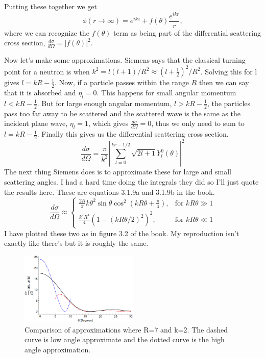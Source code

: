 \documentclass[12pt]{extarticle}
\begin{document}
Putting these together we get
\begin{equation}
   \phi(r\rightarrow\infty) = e^{ikz} + f(\theta)\frac{e^{ikr}}{r},
\end{equation}
where we can recognize the $f(\theta)$ term as being part of the differential scattering cross section, $\frac{d\sigma}{d\Omega} = \left|f(\theta)\right|^2$.

Now let's make some approximations. Siemens says that the classical turning point for a neutron is when $k^2 = l(l+1)/R^2 \approx (l+\frac{1}{2})^2/R^2$. Solving this for l gives $l=kR-\frac{1}{2}$. Now, if a particle passes within the range $R$ then we can say that it is absorbed and $\eta_l=0$. This happens for small angular momentum $l < kR-\frac{1}{2}$. But for large enough angular momentum, $l > kR - \frac{1}{2}$, the particles pass too far away to be scattered and the scattered wave is the same as the incident plane wave, $\eta_l=1$, which gives $\frac{d\sigma}{d\Omega} = 0$, thus we only need to sum to $l=kR-\frac{1}{2}$. Finally this gives us the differential scattering cross section.
\begin{equation}
   \frac{d\sigma}{d\Omega} = \frac{\pi}{k^2} \left|\sum\limits_{l=0}^{kr-1/2} \sqrt{2l+1} Y_l^0(\theta)\right|^2
\end{equation}
The next thing Siemens does is to approximate these for large and small scattering angles. I had a hard time doing the integrals they did so I'll just quote the results here. These are equations 3.1.9a and 3.1.9b in the book.
\begin{equation}
   \frac{d\sigma}{d\Omega} \approx
\begin{cases}
   \frac{2R}{\pi} k\theta^2 \sin\theta\cos^2\left(kR\theta+\frac{\pi}{4}\right),& \text{for } kR\theta \gg 1 \\
   \frac{k^2R^4}{4}(1-(kR\theta/2)^2)^2,& \text{for } kR\theta \ll 1
\end{cases}
\end{equation}
I have plotted these two as in figure 3.2 of the book. My reproduction isn't exactly like there's but it is roughly the same.
\begin{figure}[h]
   \centering
   \includegraphics[width=0.5\textwidth]{fig3_2.png}
   \caption{Comparison of approximations where R=7 and k=2. The dashed curve is low angle approximate and the dotted curve is the high angle approximation.}
\end{figure}
\end{document}
